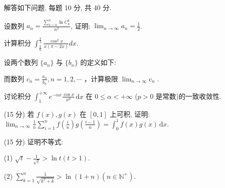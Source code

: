 \par{}
解答如下问题. 每题 10 分, 共 40 分.\par
设数列 $a_{n} = \frac{\sum\limits_{k=0}^{n}\ln C_{n}^{k}}{n^{2}}$, 证明: $\lim_{n\to\infty}a_n = \frac{1}{2}$.\par
计算积分  $\int_{\frac{\pi}{6}}^{\frac{\pi}{3}}\frac{\cos^{2}x}{x(\pi-2x)}dx.$\par
\par{}
设两个数列 $\{a_{n}\}$ 与 $\{b_{n}\}$ 的定义如下:\par
\nopagebreak[4]
而数列  $c_{n}=\frac{a_{n}}{b_{n}}, n=1,2,\cdots$ ，计算极限  $\lim_{n\to\infty}c_{n}$ .\par
讨论积分 $\int_{1}^{+\infty} e^{-\alpha x} \frac{\cos x}{x^p} \, \mathrm{d}x$ 在 $0 \leq \alpha < +\infty$ ($p > 0$ 是常数)的一致收敛性.\par
\par{}
(15 分) 若 $f(x), g(x)$ 在 $[0, 1]$ 上可积, 证明: $\lim_{n \to \infty} \frac{1}{n} \sum_{i=1}^{n} f\left(\frac{i}{n}\right) g\left(\frac{i-1}{n}\right) = \int_0^1 f(x) g(x) \, \mathrm{d}x$.\par
\par{}
(15 分) 证明不等式:\par
(1) $\sqrt{t} - \frac{1}{\sqrt{t}} > \ln t (t > 1)$.\par
(2) $\sum_{k=1}^{n} \frac{1}{\sqrt{k^2 + k}} > \ln(1 + n) (n \in \mathbb{N}^+)$.\par
\par{}
